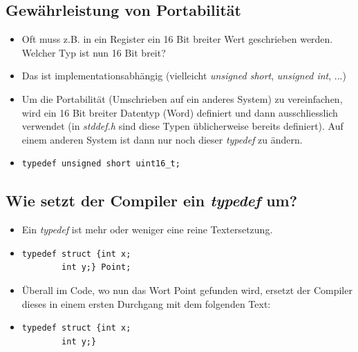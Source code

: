 \subsection{Gewährleistung von Portabilität}
\begin{itemize}
	\item Oft muss z.B. in ein Register ein 16 Bit breiter Wert geschrieben werden. Welcher Typ ist nun 16 Bit breit?
	\item Das ist implementationsabhängig (vielleicht \emph{unsigned short}, \emph{unsigned int}, ...)
	\item Um die Portabilität (Umschrieben auf ein anderes System) zu vereinfachen, wird ein 16 Bit breiter Datentyp (Word) definiert und dann ausschliesslich verwendet (in \emph{stddef.h} sind diese Typen üblicherweise bereits definiert). Auf einem anderen System ist dann nur noch dieser \emph{typedef} zu ändern.
	\item[\-] 
\vspace{-\baselineskip}
\begin{minipage}{0.45\linewidth}
\begin{lstlisting}
typedef unsigned short uint16_t;
\end{lstlisting}
\end{minipage}
\end{itemize}

\subsection{Wie setzt der Compiler ein \emph{typedef} um?}
\begin{itemize}
	\item Ein \emph{typedef} ist mehr oder weniger eine reine Textersetzung.
	\item[\-]
\vspace{-\baselineskip}
\begin{minipage}{0.3\linewidth}
\begin{lstlisting}
typedef struct {int x;
		int y;} Point;
\end{lstlisting}
\end{minipage}
	\item Überall im Code, wo nun das Wort Point gefunden wird, ersetzt der Compiler dieses in einem ersten Durchgang mit dem folgenden Text:
	\item[\-]
\vspace{-\baselineskip}
\begin{minipage}{0.3\linewidth}
\begin{lstlisting}
typedef struct {int x;
		int y;}
\end{lstlisting}
\end{minipage}	
\end{itemize}

